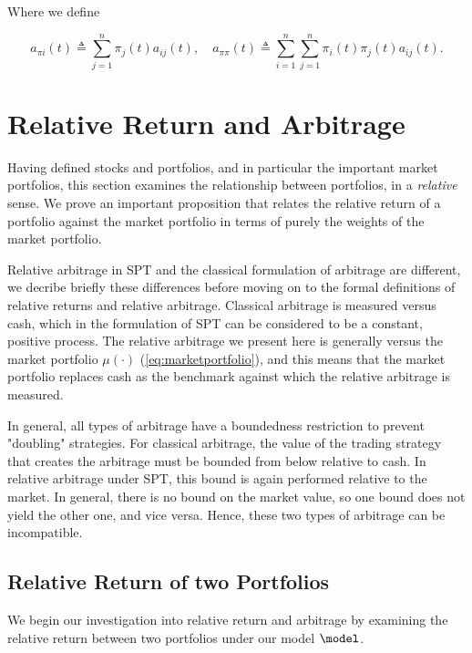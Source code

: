 \documentclass[british]{amsart} \usepackage{lmodern}
\numberwithin{equation}{section} \numberwithin{figure}{section}
\theoremstyle{plain} \newtheorem{thm}{\protect\theoremname}[section]
\theoremstyle{definition} \newtheorem{defn}[thm]{\protect\definitionname}
\theoremstyle{plain} \newtheorem{assumption}[thm]{\protect\assumptionname}
\theoremstyle{plain} \newtheorem{lem}[thm]{\protect\lemmaname}
\theoremstyle{plain} \newtheorem{prop}[thm]{\protect\propositionname}
\theoremstyle{remark} \newtheorem{rem}[thm]{\protect\remarkname}
\theoremstyle{plain} \newtheorem{cor}[thm]{\protect\corollaryname}
\newcommand{\defeq}{\mathop{\triangleq}} \newcommand{\almostsurely}{\text{a.s.}}
\begin{document}
Where we define

  \begin{equation}
      a_{\pi i}(t) \defeq \sum_{j=1}^{n} \pi_{j}(t)a_{ij}(t), \quad 
      a_{\pi \pi}(t) \defeq \sum_{i=1}^{n} \sum_{j=1}^{n} \pi_{i}(t) \pi_{j}(t) a_{ij}(t).
  \end{equation}

\newpage
\section{Relative Return and Arbitrage}

Having defined stocks and portfolios, and in particular the important market
portfolios, this section examines the relationship between portfolios, in 
a \textit{relative} sense. We prove an important proposition that relates
the relative return of a portfolio against the market portfolio in terms
of purely the weights of the market portfolio.

Relative arbitrage in SPT and the classical formulation of arbitrage are
different, we decribe briefly these differences before moving on to the formal
definitions of relative returns and relative arbitrage. Classical arbitrage is
measured versus cash, which in the formulation of SPT can be considered to be a
constant, positive process. The relative arbitrage we present here is generally
versus the market portfolio $\mu(\cdot)$ (\ref{eq:marketportfolio}), and this
means that the market portfolio replaces cash as the benchmark against which the
relative arbitrage is measured. 

In general, all types of arbitrage have a boundedness restriction to prevent
"doubling" strategies. For classical arbitrage, the value of the trading
strategy that creates the arbitrage must be bounded from below relative to cash.
In relative arbitrage under SPT, this bound is again performed relative to the
market. In general, there is no bound on the market value, so one bound does not
yield the other one, and vice versa. Hence, these two types of arbitrage can be
incompatible.

\subsection{Relative Return of two Portfolios}

We begin our investigation into relative return and arbitrage by examining the
relative return between two portfolios under our model $\model$.
\end{document}
